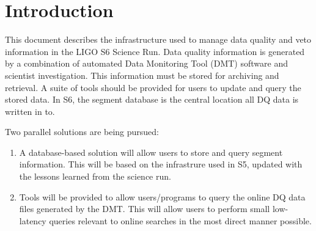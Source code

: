 


\section{Introduction}

This document describes the infrastructure used to manage data quality
and veto information in the LIGO S6 Science Run. Data quality
information is generated by a combination of automated Data Monitoring
Tool (DMT) software and scientist investigation. This information must
be stored for archiving and retrieval. A suite of tools should be
provided for users to update and query the stored data. In S6, the
segment database is the central location all DQ data is written in to. 

Two parallel solutions are being pursued:
\begin{enumerate}
\item A database-based solution will allow users to store and query segment
information. This will be based on the infrastrure used in S5, updated with
the lessons learned from the science run.
\item Tools will be provided to allow users/programs to query the online DQ
data files generated by the DMT. This will allow users to perform small
low-latency queries relevant to online searches in the most direct manner
possible.
\end{enumerate}

